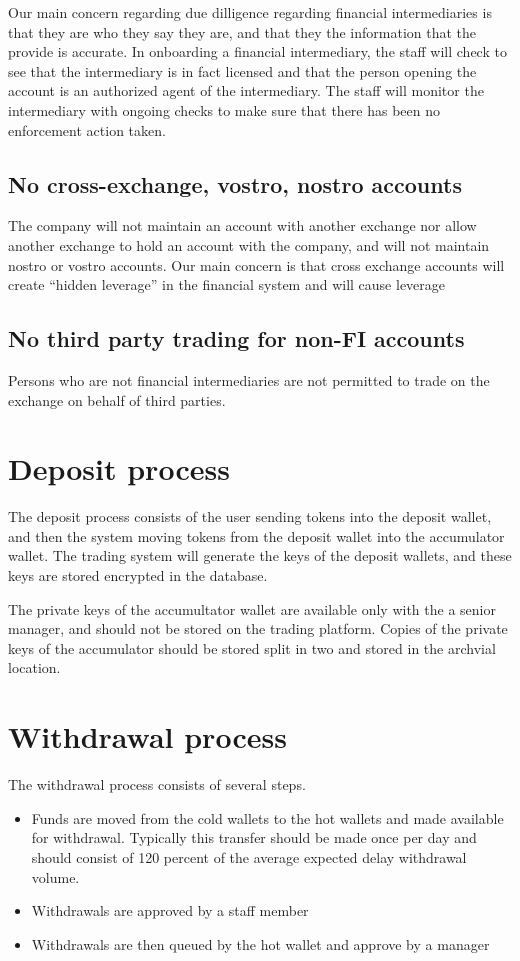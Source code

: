 Our main concern regarding due dilligence regarding financial
intermediaries is that they are who they say they are, and that they
the information that the provide is accurate.  In onboarding a
financial intermediary, the staff will check to see that the
intermediary is in fact licensed and that the person opening the
account is an authorized agent of the intermediary.  The staff will
monitor the intermediary with ongoing checks to make sure that there
has been no enforcement action taken.

\subsection{No cross-exchange, vostro, nostro accounts}
The company will not maintain an account with another exchange nor
allow another exchange to hold an account with the company, and will
not maintain nostro or vostro accounts.  Our main concern is that
cross exchange accounts will create ``hidden leverage'' in the
financial system and will cause leverage

\subsection{No third party trading for non-FI accounts}
Persons who are not financial intermediaries are not permitted to
trade on the exchange on behalf of third parties.

\section{Deposit process}
The deposit process consists of the user sending tokens into the
deposit wallet, and then the system moving tokens from the deposit
wallet into the accumulator wallet.  The trading system will generate
the keys of the deposit wallets, and these keys are stored encrypted
in the database.

The private keys of the accumultator wallet are available only with
the a senior manager, and should not be stored on the trading
platform.  Copies of the private keys of the accumulator should be
stored split in two and stored in the archvial location.

\section{Withdrawal process}

The withdrawal process consists of several steps.
\begin{itemize}
  \item Funds are moved from the cold wallets to the hot wallets and
    made available for withdrawal.  Typically this transfer should be
    made once per day and should consist of 120 percent of the average
    expected delay withdrawal volume.
  \item Withdrawals are approved by a staff member
  \item Withdrawals are then queued by the hot wallet and approve by a manager
\end{itemize}

